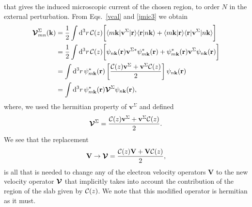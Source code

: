 \documentclass[floatfix,prb,aps,superscriptaddress,showpacs,11pt,preprint,letterpaper]{revtex4}
\begin{document}
that gives the induced microscopic current of the chosen region, to order $N$ 
in the external perturbation. 
From
Eqs.~\eqref{vcal} and \eqref{jmic3} we obtain
\begin{align}\label{intj}
{\boldsymbol{\mathcal{V}}}^{\Sigma}_{mn}({\mathbf k})
&=
\frac{1}{2}
\int \mathrm{d}^3 r\,
 {\mathbf{\cal C}}(z)
\bigg[
\langle m\mathbf{k}|\mathbf{v}^\Sigma | \mathbf{r}\rangle
\langle \mathbf{r} | n \mathbf k \rangle +
\langle m\mathbf{k} | \mathbf{r}\rangle
\langle \mathbf{r} | \mathbf{v}^\Sigma | n \mathbf k \rangle\bigg]
\nonumber\\
&=
\frac{1}{2}
\int \mathrm{d}^3 r\,
 {\mathbf{\cal C}}(z)
 \bigg[
\psi_{n\mathbf{k}}(\mathbf{r})
\mathbf{v}^{\Sigma *}\psi^*_{m\mathbf{k}}(\mathbf{r})
+ 
\psi^*_{m\mathbf{k}}(\mathbf{r})\mathbf{v}^\Sigma
\psi_{n\mathbf{k}}(\mathbf{r})
\bigg]
\nonumber\\
&=
\int \mathrm{d}^3 r\,
\psi^*_{m\mathbf{k}}(\mathbf{r})
\left[\frac{{\mathbf{\cal C}}(z) \mathbf{v}^\Sigma +
\mathbf{v}^\Sigma {\mathbf{\cal C}}(z)}{2}\right]
\psi_{n\mathbf{k}}(\mathbf{r})
\nonumber\\
&=
\int \mathrm{d}^3 r\,
\psi^*_{m\mathbf{k}}(\mathbf{r})
\boldsymbol{\mathcal{\cal V}}^{\Sigma}
\psi_{n\mathbf{k}}(\mathbf{r})
,
\end{align}
where, we used the hermitian property of $\mathbf{v}^\Sigma$ and defined
\begin{align}\label{nl.4}
\boldsymbol{\mathcal{\cal V}}^{\Sigma}
=
\frac{{\mathbf{\cal C}}(z) \mathbf{v}^\Sigma +
\mathbf{v}^\Sigma {\mathbf{\cal C}}(z)}{2}
.
\end{align} 
We see that the replacement
\begin{align}\label{vcali}
\mathbf{V} \to \boldsymbol{\mathcal{\cal V}}=\frac{{\mathbf{\cal C}}(z) \mathbf{V} +
\mathbf{V} {\mathbf{\cal C}}(z)}{2}
,
\end{align} 
is all that is needed to change any of the
electron velocity operators $\mathbf{V}$ to the new velocity
operator $\boldsymbol{\mathcal{\cal V}}$ that implicitly takes into account the
contribution of the region of the slab given by ${\mathbf{\cal C}}(z)$.
We note that this modified operator is hermitian as it must.\cite{note2}
\end{document}
